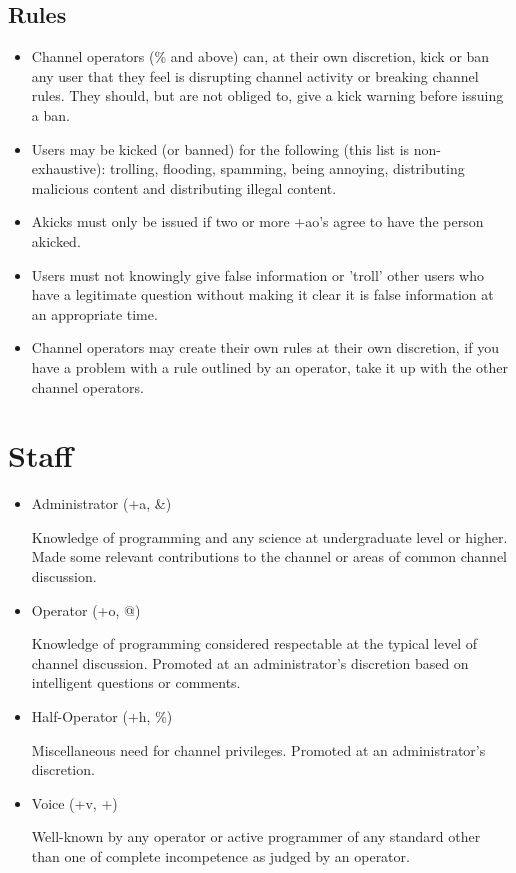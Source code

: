 \documentclass[11pt,a4paper,notitlepage]{article}
\begin{document}
\subsection{Rules}
\begin{itemize}
\item Channel operators (\% and above) can, at their own discretion, kick or ban any user that they feel is disrupting channel activity or breaking channel rules.
They should, but are not obliged to, give a kick warning before issuing a ban.
\item Users may be kicked (or banned) for the following (this list is non-exhaustive): trolling, flooding, spamming, being annoying, distributing malicious content and distributing illegal content. 
\item Akicks must only be issued if two or more +ao's agree to have the person akicked. 
\item Users must not knowingly give false information or 'troll' other users who have a legitimate question without making it clear it is false information at an appropriate time.
\item Channel operators may create their own rules at their own discretion, if you have a problem with a rule outlined by an operator, take it up with the other channel operators.
\end{itemize}

\section{Staff}
\begin{itemize}
\item Administrator (+a, \&)

Knowledge of programming and any science at undergraduate level or higher.
Made some relevant contributions to the channel or areas of common channel discussion.
\item Operator (+o, @)

Knowledge of programming considered respectable at the typical level of channel discussion.
Promoted at an administrator's discretion based on intelligent questions or comments.
\item Half-Operator (+h, \%)

Miscellaneous need for channel privileges.
Promoted at an administrator's discretion.
\item Voice (+v, +)

Well-known by any operator or active programmer of any standard other than one of complete incompetence as judged by an operator.
\end{itemize}
\end{document}
